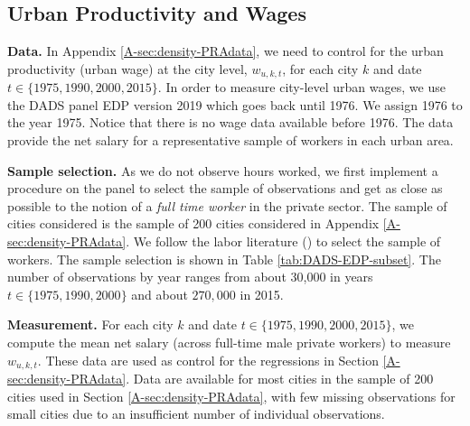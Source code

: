 \documentclass[11pt]{report}
\newcommand{\DADSpanel}{../../output/CASD/2022-07-08}
\begin{document}
\subsection{Urban Productivity and Wages}\label{A-sec:DADSwage}

\noindent \textbf{Data.} In Appendix \ref{A-sec:density-PRAdata}, we need to control for the urban productivity (urban wage) at the city level, $w_{u,k,t}$, for each city $k$ and date $t \in\{1975, 1990, 2000, 2015\}$. In order to measure city-level urban wages, we use the DADS panel EDP version 2019 which goes back until 1976. We assign 1976 to the year 1975. Notice that there is no wage data available before 1976. The data provide the net salary for a representative sample of workers in each urban area. 

\noindent \textbf{Sample selection.} As we do not observe hours worked, we first implement a procedure on the panel to select the sample of observations and get as close as possible to the notion of a \emph{full time worker} in the private sector. The sample of cities considered is the sample of 200 cities considered in Appendix \ref{A-sec:density-PRAdata}. We follow the labor literature (\cite{schmutzsidibe}) to select the sample of workers. The sample selection is shown in Table \ref{tab:DADS-EDP-subset}. The number of observations by year ranges from about 30,000 in years $t\in \{1975, 1990, 2000\}$ and about $270,000$ in 2015.



\noindent \textbf{Measurement.} For each city $k$ and date $t \in\{1975, 1990, 2000, 2015\}$, we compute the mean net salary (across full-time male private workers) to measure $w_{u,k,t}$. These data are used as control for the regressions in Section \ref{A-sec:density-PRAdata}. Data are available for most cities in the sample of 200 cities used in Section \ref{A-sec:density-PRAdata}, with few missing observations for small cities due to an insufficient number of individual observations.
\end{document}
